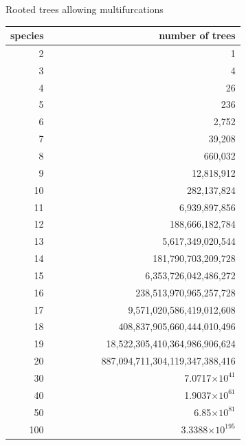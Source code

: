 \documentclass[bluish,slideColor,colorBG,pdf]{prosper}
\begin{document}
\begin{slide}[Replace]{Rooted trees allowing multifurcations}

\vspace{-0.1in}
{
\begin{center}
\renewcommand{\arraystretch}{0.85}
\begin{tabular}{r r}
 {\rm species} & {\rm number of trees}\\
\hline
 2 & 1\\
 3 & 4\\
 4 & 26\\
 5 & 236\\
 6 & 2,752\\
 7 & 39,208\\
 8 & 660,032\\
 9 & 12,818,912\\
 10 & 282,137,824\\
 11 & 6,939,897,856\\
 12 & 188,666,182,784\\
 13 & 5,617,349,020,544\\
 14 & 181,790,703,209,728\\
 15 & 6,353,726,042,486,272\\
 16 & 238,513,970,965,257,728\\
 17 & 9,571,020,586,419,012,608\\
 18 & 408,837,905,660,444,010,496\\
 19 & 18,522,305,410,364,986,906,624\\
 20 & \ \ \ \ \ \ \ \ \ \ 887,094,711,304,119,347,388,416\\
 30 & 7.0717$ \times 10^{41}$\\
 40 & 1.9037$\times 10^{61}$\\
 50 &   6.85$ \times 10^{81}$\\
 100 &  3.3388$ \times 10^{195}$
\end{tabular}
\end{center}
}

\end{slide}
\end{document}
